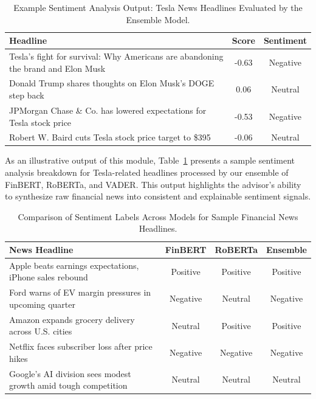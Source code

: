 \documentclass{scrartcl}
\begin{document}
\begin{enumerate}
    \begin{table}[h!]
\centering
\caption{Example Sentiment Analysis Output: Tesla News Headlines Evaluated by the Ensemble Model.}
\label{tab:tesla_sentiment_output}
\begin{tabular}{|p{8.5cm}|c|c|}
\hline
\textbf{Headline} & \textbf{Score} & \textbf{Sentiment} \\
\hline
Tesla’s fight for survival: Why Americans are abandoning the brand and Elon Musk & -0.63 & Negative \\
Donald Trump shares thoughts on Elon Musk’s DOGE step back & 0.06 & Neutral \\
JPMorgan Chase \& Co. has lowered expectations for Tesla stock price & -0.53 & Negative \\
Robert W. Baird cuts Tesla stock price target to \$395 & -0.06 & Neutral \\
\hline
\end{tabular}
\end{table}

\noindent
As an illustrative output of this module, Table~\ref{tab:tesla_sentiment_output} presents a sample sentiment analysis breakdown for Tesla-related headlines processed by our ensemble of FinBERT, RoBERTa, and VADER. This output highlights the advisor's ability to synthesize raw financial news into consistent and explainable sentiment signals.

\begin{table}[ht]
\centering
\small %
\caption{Comparison of Sentiment Labels Across Models for Sample Financial News Headlines.}
\label{tab:sentiment_model_comparison}
\begin{tabular}{|p{8.5cm}|c|c|c|}
\hline
\textbf{News Headline} & \textbf{FinBERT} & \textbf{RoBERTa} & \textbf{Ensemble} \\
\hline
Apple beats earnings expectations, iPhone sales rebound & Positive & Positive & Positive \\
Ford warns of EV margin pressures in upcoming quarter & Negative & Neutral & Negative \\
Amazon expands grocery delivery across U.S. cities & Neutral & Positive & Positive \\
Netflix faces subscriber loss after price hikes & Negative & Negative & Negative \\
Google’s AI division sees modest growth amid tough competition & Neutral & Neutral & Neutral \\
\hline
\end{tabular}
\end{table}



\end{enumerate}
\end{document}
